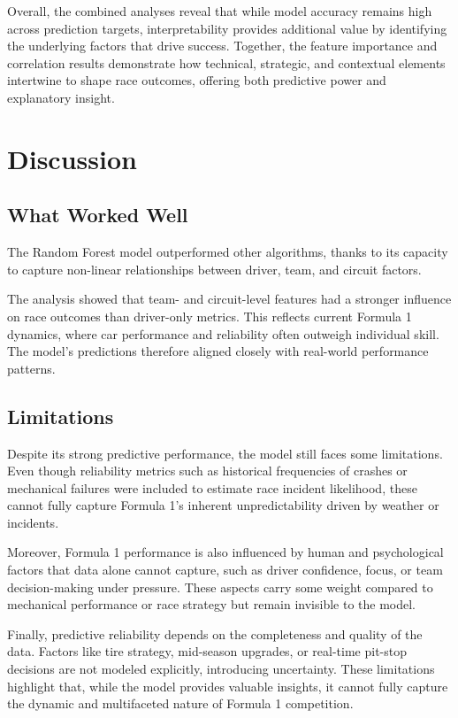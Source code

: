 \documentclass[11pt,a4paper]{article}
\begin{document}
Overall, the combined analyses reveal that while model accuracy remains high across prediction targets, interpretability provides additional value by identifying the underlying factors that drive success. Together, the feature importance and correlation results demonstrate how technical, strategic, and contextual elements intertwine to shape race outcomes, offering both predictive power and explanatory insight.



\section{Discussion}
\label{sec:discussion}

\subsection{What Worked Well}
\label{subsec:What Worked Well}

The Random Forest model outperformed other algorithms, thanks to its capacity to capture non-linear relationships between driver, team, and circuit factors.

The analysis showed that team- and circuit-level features had a stronger influence on race outcomes than driver-only metrics. This reflects current Formula 1 dynamics, where car performance and reliability often outweigh individual skill. The model’s predictions therefore aligned closely with real-world performance patterns.

\subsection{Limitations}
\label{subsec:limitations}

Despite its strong predictive performance, the model still faces some limitations. Even though reliability metrics such as historical frequencies of crashes or mechanical failures were included to estimate race incident likelihood, these cannot fully capture Formula 1’s inherent unpredictability driven by weather or incidents.

Moreover, Formula 1 performance is also influenced by human and psychological factors that data alone cannot capture, such as driver confidence, focus, or team decision-making under pressure. These aspects carry some weight compared to mechanical performance or race strategy but remain invisible to the model.

Finally, predictive reliability depends on the completeness and quality of the data. Factors like tire strategy, mid-season upgrades, or real-time pit-stop decisions are not modeled explicitly, introducing uncertainty. These limitations highlight that, while the model provides valuable insights, it cannot fully capture the dynamic and multifaceted nature of Formula 1 competition.
\end{document}

